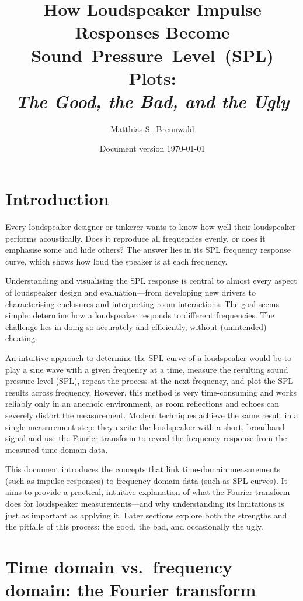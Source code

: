 \documentclass[12pt,a4paper]{article}
\title{How Loudspeaker Impulse Responses Become Sound~Pressure~Level~(SPL) Plots:\\[0.7em]\textit{The Good, the Bad, and the Ugly}}
\author{Matthias S.~Brennwald}
\date{Document version \today}
\providecommand{\seclabel}[1]{\label{sec:#1}}
\begin{document}
\maketitle

\section{Introduction}

Every loudspeaker designer or tinkerer wants to know how well their loudspeaker performs acoustically. Does it reproduce all frequencies evenly, or does it emphasise some and hide others? The answer lies in its SPL frequency response curve, which shows how loud the speaker is at each frequency.

Understanding and visualising the SPL response is central to almost every aspect of loudspeaker design and evaluation—from developing new drivers to characterising enclosures and interpreting room interactions. The goal seems simple: determine how a loudspeaker responds to different frequencies. The challenge lies in doing so accurately and efficiently, without (unintended) cheating.

An intuitive approach to determine the SPL curve of a loudspeaker would be to play a sine wave with a given frequency at a time, measure the resulting sound pressure level (SPL), repeat the process at the next frequency, and plot the SPL results across frequency. However, this method is very time-consuming and works reliably only in an anechoic environment, as room reflections and echoes can severely distort the measurement. Modern techniques achieve the same result in a single measurement step: they excite the loudspeaker with a short, broadband signal and use the Fourier transform to reveal the frequency response from the measured time-domain data.

This document introduces the concepts that link time-domain measurements (such as impulse responses) to frequency-domain data (such as SPL curves). It aims to provide a practical, intuitive explanation of what the Fourier transform does for loudspeaker measurements—and why understanding its limitations is just as important as applying it. Later sections explore both the strengths and the pitfalls of this process: the good, the bad, and occasionally the ugly.


\section{Time domain vs.\ frequency domain: the Fourier transform}\seclabel{Fourier_Theory}
\end{document}
